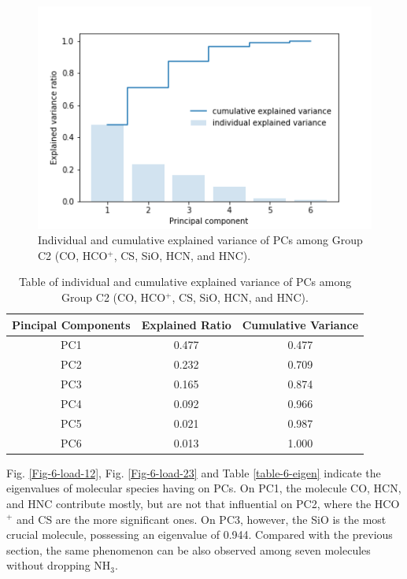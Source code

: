 \documentclass{aa}
\begin{document}
\begin{CJK*}{UTF8}{gbsn}
  
    \begin{figure}[htbp]
       \centering
       \captionsetup{justification=centering}
       \includegraphics[angle=0,scale = 0.6]{6/explained_variance_ratio.png}
       \caption{Individual and cumulative explained variance of PCs among Group C2 (CO, HCO$^+$, CS, SiO, HCN, and HNC).}
       \label{Fig13}
    \end{figure}
   
   
    \begin{table}[htbp]
        \centering
        \begin{tabular}{ccc}
        \hline\hline
        \multicolumn{1}{l}{Pincipal Components} & \multicolumn{1}{l}{Explained Ratio} & Cumulative Variance \\ \hline
                PC1 & 0.477  & 0.477\\ 
                PC2 & 0.232  & 0.709\\
                PC3 & 0.165  & 0.874\\
                PC4 & 0.092  & 0.966\\ 
                PC5 & 0.021  & 0.987\\
                PC6 & 0.013  & 1.000\\ \hline\hline
        \end{tabular}
        \caption{Table of individual and cumulative explained variance of PCs among Group C2 (CO, HCO$^+$, CS, SiO, HCN, and HNC).}
        \label{table-6-variance}
    \end{table}

  Fig. \ref{Fig-6-load-12}, Fig. \ref{Fig-6-load-23} and Table \ref{table-6-eigen} indicate the eigenvalues of molecular species having on PCs. On PC1, the molecule CO, HCN, and HNC contribute mostly, but are not that influential on PC2, where the HCO$^+$ and CS are the more significant ones. 
  On PC3, however, the SiO is the most crucial molecule, possessing an eigenvalue of 0.944. 
  Compared with the previous section, the same phenomenon can be also observed among seven molecules without dropping NH$_3$. 
  

\end{CJK*}
\end{document}
